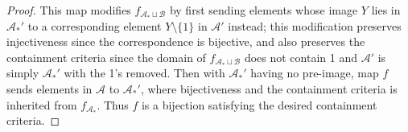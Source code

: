 \documentclass{article}
\begin{document}
\begin{proof}
    This map modifies $f_{\mathcal{A}_*\sqcup\mathcal{B}}$ by first sending
    elements whose image $Y$ lies in $\mathcal{A}_*'$ to a corresponding
    element $Y\setminus\{1\}$ in $\mathcal{A}'$ instead; this modification
    preserves injectiveness since the correspondence is bijective, and also
    preserves the containment criteria since the domain of
    $f_{\mathcal{A}_*\sqcup\mathcal{B}}$ does not contain 1 and
    $\mathcal{A}'$ is simply $\mathcal{A}_*'$ with the 1's removed. Then
    with $\mathcal{A}_*'$ having no pre-image, map $f$ sends elements in
    $\mathcal{A}$ to $\mathcal{A}_*'$, where bijectiveness and the
    containment criteria is inherited from $f_{\mathcal{A}_*}$. Thus $f$
    is a bijection satisfying the desired containment criteria. 
  \end{proof}
\end{document}
